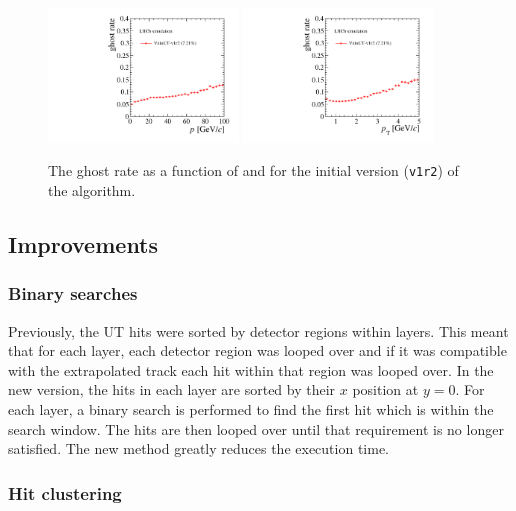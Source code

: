 \begin{figure}[!tb]
\centering
\includegraphics[width=0.45\textwidth]{figs/upstream-tracking-upgrade/gr_p_v1r2.pdf}
\includegraphics[width=0.45\textwidth]{figs/upstream-tracking-upgrade/gr_pt_v1r2.pdf}
\caption{The ghost rate as a function of \ptot and \pt for the initial version (\texttt{v1r2}) of the \velout algorithm.}
\label{fig:gr_velout_v1r2}
\end{figure}

\subsection{Improvements}

\subsubsection{Binary searches}

Previously, the UT hits were sorted by detector regions within layers. This meant that for each layer, each detector region was looped over and if it was compatible with the extrapolated \velo track each hit within that region was looped over. In the new version, the hits in each layer are sorted by their $x$ position at $y = 0$. For each layer, a binary search is performed to find the first hit which is within the search window. The hits are then looped over until that requirement is no longer satisfied. The new method greatly reduces the execution time.

\subsubsection{Hit clustering}

